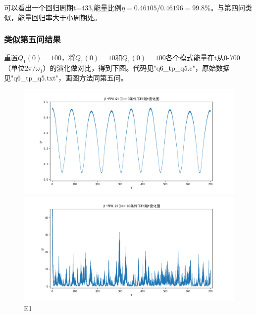 \documentclass[10pt, a4paper]{article}
\begin{document}
    可以看出一个回归周期t=433,能量比例$\eta=0.46105/0.46196=99.8\%$。与第四问类似，能量回归率大于小周期处。

    \subsubsection{类似第五问结果}

    重置$Q_1(0)=100$，将$Q_1(0)=10$和$Q_1(0)=100$各个模式能量在t从0-700（单位$2\pi/\omega_1$）的演化做对比，得到下图。代码见"q6_tp_q5.c"，原始数据见"q6_tp_q5.txt"，画图方法同第五问。

    \begin{figure}[H]
        \begin{minipage}[t]{0.49\textwidth}
            \centering
            \includegraphics[width=\textwidth]{./q6_pics/cmp/E1.png}
        \end{minipage}
        \begin{minipage}[t]{0.49\textwidth}
            \centering
            \includegraphics[width=\textwidth]{./q6_pics/exp/E1.png}
        \end{minipage}
        \caption{E1}\label{fig:E1 in q6}
    \end{figure}
\end{document}
